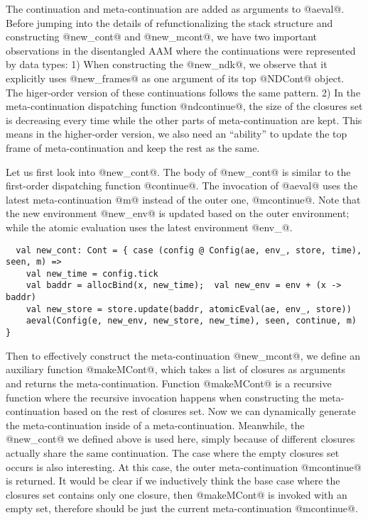 \documentclass[acmsmall, review]{acmart}\settopmatter{}
\begin{document}
The continuation and meta-continuation are added as arguments to @aeval@.
Before jumping into the details of refunctionalizing the stack structure and constructing
@new_cont@ and @new_mcont@, we have two important observations in the disentangled AAM
where the continuations were represented by data types:
1) When constructing the @new_ndk@, we observe that it explicitly uses @new_frames@ as one
argument of its top @NDCont@ object. The higer-order version of these continuations follows
the same pattern.
2) In the meta-continuation dispatching function @ndcontinue@, the size of the closures set is
decreasing every time while the other parts of meta-continuation are kept. This means in 
the higher-order version, we also need an ``ability'' to update the top frame of meta-continuation
and keep the rest as the same.

Let us first look into @new_cont@. The body of @new_cont@ is similar to the first-order dispatching
function @continue@. The invocation of @aeval@ uses the latest meta-continuation @m@ instead of the outer
one, @mcontinue@. Note that the new environment @new_env@ is updated based on the outer environment;
while the atomic evaluation uses the latest environment @env_@.

\begin{lstlisting}
  val new_cont: Cont = { case (config @ Config(ae, env_, store, time), seen, m) =>
    val new_time = config.tick
    val baddr = allocBind(x, new_time);  val new_env = env + (x -> baddr)
    val new_store = store.update(baddr, atomicEval(ae, env_, store))
    aeval(Config(e, new_env, new_store, new_time), seen, continue, m) }
\end{lstlisting}

Then to effectively construct the meta-continuation @new_mcont@, we define an auxiliary function
@makeMCont@, which takes a list of closures as arguments and returns the meta-continuation. 
Function @makeMCont@ is a recursive function where the recursive invocation happens when 
constructing the meta-continuation based on the rest of closures set. 
Now we can dynamically generate the meta-continuation inside of a meta-continuation.
Meanwhile, the @new_cont@ we defined above is used here, simply because of different closures 
actually share the same continuation.
The case where the empty closures set occurs is also interesting. At this case,
the outer meta-continuation @mcontinue@ is returned.
It would be clear if we inductively think the base case where the closures set contains only one 
closure, then @makeMCont@ is invoked with an empty set, therefore should be just the 
current meta-continuation @mcontinue@.
\end{document}
